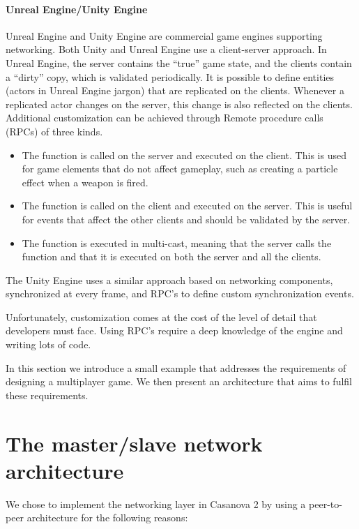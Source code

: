 \paragraph{Unreal Engine/Unity Engine} Unreal Engine \cite{games2006unreal} and Unity Engine \cite{engine9unity} are commercial game engines supporting networking.  Both Unity and Unreal Engine use a client-server approach. In Unreal Engine, the server contains the ``true'' game state, and the clients contain a ``dirty'' copy, which is validated periodically. It is possible to define entities (actors in Unreal Engine jargon) that are replicated on the clients. Whenever a replicated actor changes on the server, this change is also reflected on the clients. Additional customization can be achieved through Remote procedure calls (RPCs) of three kinds.
\begin{itemize}
	\item The function is called on the server and executed on the client. This is used for game elements that do not affect gameplay, such as creating a particle effect when a weapon is fired.
	\item The function is called on the client and executed on the server. This is useful for events that affect the other clients and should be validated by the server.
	\item The function is executed in multi-cast, meaning that the server calls the function and that it is executed on both the server and all the clients.
\end{itemize}

The Unity Engine uses a similar approach based on networking components, synchronized at every frame, and RPC's to define custom synchronization events.

Unfortunately, customization comes at the cost of the level of detail that developers must face. Using RPC's require a deep knowledge of the engine and writing lots of code. 

In this section we introduce a small example that addresses the requirements of designing a multiplayer game. We then present an architecture that aims to fulfil these requirements.

\section{The master/slave network architecture}

We chose to implement the networking layer in Casanova 2 by using a peer-to-peer architecture for the following reasons:

